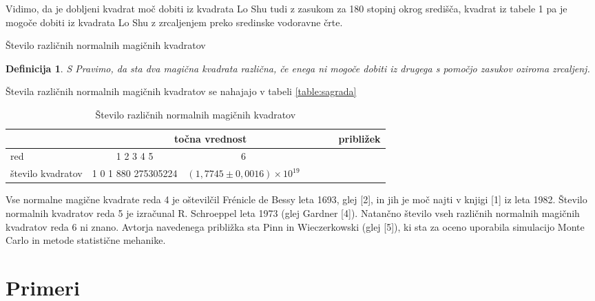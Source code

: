 \documentclass[a4paper,12pt]{article}
\newtheorem{definition}{Definicija}
\begin{document}
Vidimo, da je dobljeni kvadrat moč dobiti iz kvadrata Lo Shu tudi z zasukom za
180 stopinj okrog središča, kvadrat iz tabele 1 pa je mogoče dobiti
iz kvadrata Lo Shu z zrcaljenjem preko sredinske vodoravne črte.

Število različnih normalnih magičnih kvadratov

\begin{definition}
   
S
      Pravimo, da sta dva magična kvadrata \emph{različna}, če enega ni mogoče dobiti
      iz drugega s pomočjo zasukov oziroma zrcaljenj.
   \end{definition}

Števila različnih normalnih magičnih kvadratov se nahajajo v tabeli \ref{table:sagrada}

\begin{table}[!ht]
   \centering
\caption{Število različnih normalnih magičnih kvadratov}
\begin{tabular}{lcccccc}\toprule

   &\multicolumn{5}{c}{točna vrednost}&približek\\
    \midrule 
      red             &1 2 3 4 5&6\\
      število kvadratov&1 0 1 880 275305224&$(1,7745\pm 0,0016)\times 10^{19} $\\
      \bottomrule
\end{tabular}
\end{table}



Vse normalne magične kvadrate reda 4 je oštevilčil Frénicle de Bessy
leta 1693, glej [2], in jih je moč najti v knjigi [1]
iz leta 1982. Število normalnih kvadratov reda 5 je izračunal
R. Schroeppel leta 1973 (glej Gardner [4]).
Natančno število vseh različnih normalnih magičnih kvadratov reda 6 ni znano.
Avtorja navedenega približka sta Pinn in Wieczerkowski (glej [5]), ki
sta za oceno uporabila simulacijo Monte Carlo in metode statistične mehanike.
\cite{bessy, berlekamp, gardner, pinn}


\section{Primeri}
\end{document}
